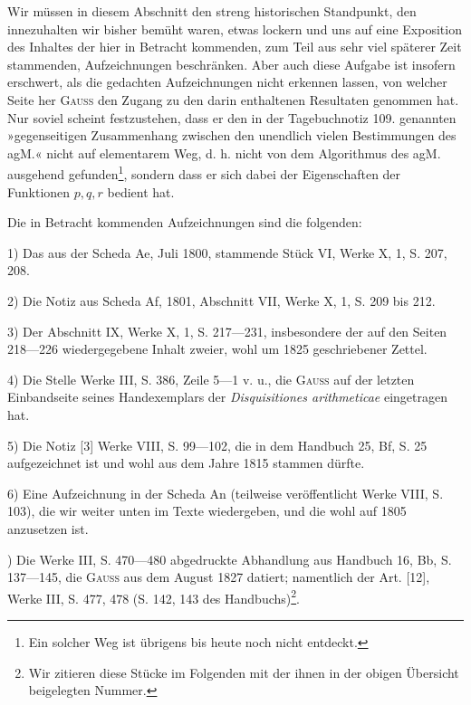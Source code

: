 \par\medskip
\begin{center}\end{center}
\noindent\hspace*{\parindent}Wir müssen in diesem Abschnitt den streng historischen Standpunkt, den
innezuhalten wir bisher bemüht waren, etwas lockern und uns auf eine Exposition
des Inhaltes der hier in Betracht kommenden, zum Teil  aus
sehr viel späterer Zeit stammenden, Aufzeichnungen beschränken. Aber auch
diese Aufgabe ist insofern erschwert, als die gedachten Aufzeichnungen nicht
erkennen lassen, von welcher Seite her \textsc{Gauss} den Zugang zu den darin enthaltenen
Resultaten genommen hat. Nur soviel scheint festzustehen, dass er den in
der Tagebuchnotiz 109. genannten »gegenseitigen Zusammenhang zwischen den
unendlich vielen Bestimmungen des agM.« nicht auf elementarem Weg, d. h.
nicht von dem Algorithmus des agM. ausgehend gefunden\footnote{Ein solcher  Weg ist übrigens bis heute noch nicht entdeckt.}, sondern dass er
sich dabei der Eigenschaften der Funktionen \(p,q,r\) bedient hat.

Die in Betracht kommenden Aufzeichnungen sind die folgenden:

1) Das aus der Scheda Ae, Juli 1800, stammende Stück VI, Werke X, 1,
S. 207, 208.

2) Die Notiz aus Scheda Af, 1801, Abschnitt VII, Werke X, 1, S. 209
bis 212.

3) Der Abschnitt IX, Werke X, 1, S. 217—231, insbesondere der auf
den Seiten 218—226 wiedergegebene Inhalt zweier, wohl um 1825 geschriebener
Zettel.

4) Die Stelle Werke III, S. 386, Zeile 5—1 v. u., die \textsc{Gauss} auf der
letzten Einbandseite seines Handexemplars der \textit{Disquisitiones arithmeticae} eingetragen hat.

5) Die Notiz [3] Werke VIII, S. 99—102, die in dem Handbuch 25, Bf,
S. 25 aufgezeichnet ist und wohl aus dem Jahre 1815 stammen dürfte.

6) Eine Aufzeichnung in der Scheda An (teilweise veröffentlicht Werke
VIII, S. 103), die wir weiter unten im Texte wiedergeben, und die wohl auf
1805 anzusetzen ist.\par
\clearpage{}
) Die Werke III, S. 470—480 abgedruckte Abhandlung aus Handbuch
16, Bb, S. 137—145, die \textsc{Gauss} aus dem August 1827 datiert; namentlich der
Art. [12], Werke III, S. 477, 478 (S. 142, 143 des Handbuchs)\footnote{Wir zitieren diese Stücke im Folgenden mit der ihnen in der obigen Übersicht beigelegten Nummer.}.


